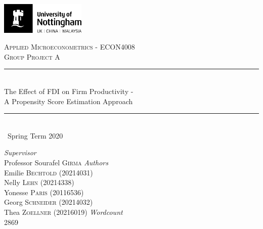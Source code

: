 \documentclass[a4paper,11pt]{scrartcl}
\newcommand{\sectionnumbering}[1]{%
  \setcounter{section}{0}%
   \renewcommand{\thesection}{\csname #1\endcsname{section}}}
\begin{document}
	\begin{titlepage}
		\newcommand{\HRule}{\rule{\linewidth}{0.5mm}}
		
	\vfill\vfill
	\includegraphics[height=1.5cm]{UoN_Logo}\\[1cm] 

	\vfill\vfill
	\center			
 
	\textsc{\Large Applied Microeconometrics - ECON4008}\\[0.5cm] 	
	\textsc{\large Group Project A}\\[0.5cm] 
	
	\HRule\\[0.4cm]
	{\huge The Effect of FDI on Firm Productivity - \\[0.4cm] A Propensity Score Estimation Approach}\\[0.4cm] 
	\HRule\\[0.4cm]
	
	{\large\ Spring Term 2020} 	
	\vfill\vfill\vfill\vfill	
	
\begin{flushleft}
			\large
			\textit{Supervisor}\\
			Professor Sourafel \textsc{Girma} 
			\vfill\vfill 
			\textit{Authors}\\
			Emilie \textsc{Bechtold} (20214031)\\
			Nelly  \textsc{Lehn} (20214338)\\
			Yonesse \textsc{Paris} (20116536)\\
			Georg  \textsc{Schneider} (20214032)\\
			Thea  \textsc{Zoellner} (20216019)
			\vfill \vfill 
			\textit{Wordcount}\\
			2869
			
		\end{flushleft}
	\vfill 


\end{titlepage}


\sectionnumbering{Roman}
\tableofcontents

\newpage

\listoftables
\listoffigures
\newpage
\end{document}
